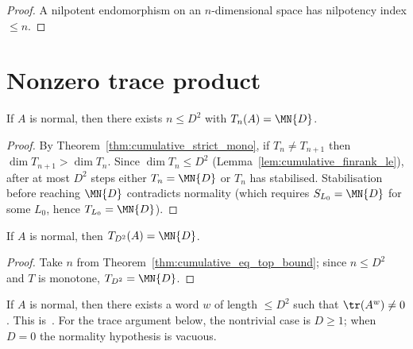 \begin{proof}\leanok
    A nilpotent endomorphism on an $n$-dimensional space has
    nilpotency index $\le n$.
\end{proof}

\section{Nonzero trace product}

\begin{theorem}\label{thm:cumulative_eq_top_bound}
    \leanok
    If $A$ is normal, then there exists $n \le D^2$ with
    $T_n(A) = \MN{D}$.
\end{theorem}

\begin{proof}
    \leanok
    By Theorem~\ref{thm:cumulative_strict_mono},
    if $T_n \neq T_{n+1}$ then $\dim T_{n+1} > \dim T_n$.
    Since $\dim T_n \le D^2$ (Lemma~\ref{lem:cumulative_finrank_le}),
    after at most $D^2$ steps either $T_n = \MN{D}$ or
    $T_n$ has stabilised.
    Stabilisation before reaching $\MN{D}$ contradicts normality
    (which requires $S_{L_0} = \MN{D}$ for some $L_0$,
    hence $T_{L_0} = \MN{D}$).
\end{proof}

\begin{theorem}\label{thm:cumulative_eq_top}
    \leanok
    If $A$ is normal, then $T_{D^2}(A) = \MN{D}$.
\end{theorem}

\begin{proof}\leanok{}
    Take $n$ from Theorem~\ref{thm:cumulative_eq_top_bound};
    since $n \le D^2$ and $T$ is monotone, $T_{D^2} = \MN{D}$.
\end{proof}

\begin{theorem}\label{thm:nonzero_trace_word}
    \leanok
    If $A$ is normal, then there exists a word $w$ of length
    $\le D^2$ such that $\tr(A^w) \neq 0$.
    This is~\cite[Lemma~1]{Sanz2010Quantum}.
    For the trace argument below, the nontrivial case is $D \ge 1$;
    when $D = 0$ the normality hypothesis is vacuous.
\end{theorem}

